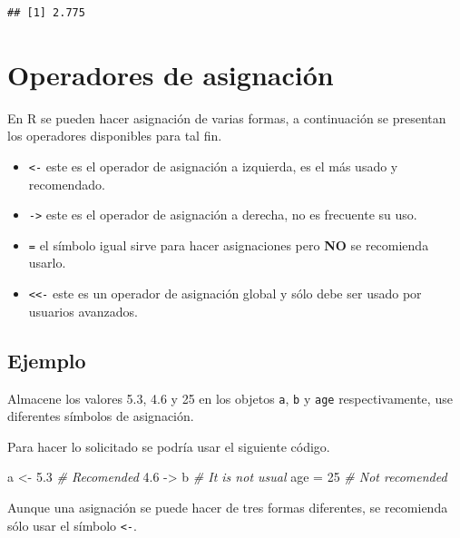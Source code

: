 \documentclass[
]{book}
\makeatletter
\newenvironment{Shaded}{\begin{snugshade}}{\end{snugshade}}
\newcommand{\CommentTok}[1]{\textcolor[rgb]{0.56,0.35,0.01}{\textit{#1}}}
\newcommand{\DecValTok}[1]{\textcolor[rgb]{0.00,0.00,0.81}{#1}}
\newcommand{\FloatTok}[1]{\textcolor[rgb]{0.00,0.00,0.81}{#1}}
\newcommand{\NormalTok}[1]{#1}
\newcommand{\OtherTok}[1]{\textcolor[rgb]{0.56,0.35,0.01}{#1}}
\providecommand{\tightlist}{%
  \setlength{\itemsep}{0pt}\setlength{\parskip}{0pt}}
\newenvironment{kframe}{%
\medskip{}
\setlength{\fboxsep}{.8em}
 \def\at@end@of@kframe{}%
 \ifinner\ifhmode%
  \def\at@end@of@kframe{\end{minipage}}%
  \begin{minipage}{\columnwidth}%
 \fi\fi%
 \def\FrameCommand##1{\hskip\@totalleftmargin \hskip-\fboxsep
 \colorbox{shadecolor}{##1}\hskip-\fboxsep
     \hskip-\linewidth \hskip-\@totalleftmargin \hskip\columnwidth}%
 \MakeFramed {\advance\hsize-\width
   \@totalleftmargin\z@ \linewidth\hsize
   \@setminipage}}%
 {\par\unskip\endMakeFramed%
 \at@end@of@kframe}
\renewenvironment{Shaded}{\begin{kframe}}{\end{kframe}}
\newenvironment{rmdblock}[1]
  {
  \begin{itemize}
  \renewcommand{\labelitemi}{
    \raisebox{-.7\height}[0pt][0pt]{
      {\setkeys{Gin}{width=3em,keepaspectratio}\texttt{[image: images/\#1]}}
    }
  }
  \setlength{\fboxsep}{1em}
  \begin{kframe}
  \item
  }
  {
  \end{kframe}
  \end{itemize}
  }
\newenvironment{rmdimportant}
  {\begin{rmdblock}{important}}
  {\end{rmdblock}}
\makeatother
\begin{document}
\begin{verbatim}
## [1] 2.775
\end{verbatim}

\hypertarget{operadores-de-asignaciuxf3n}{%
\section{Operadores de asignación}\label{operadores-de-asignaciuxf3n}}

En R se pueden hacer asignación de varias formas, a continuación se presentan los operadores disponibles para tal fin.

\begin{itemize}
\tightlist
\item
  \texttt{\textless{}-} este es el operador de asignación a izquierda, es el más usado y recomendado.
\item
  \texttt{-\textgreater{}} este es el operador de asignación a derecha, no es frecuente su uso.
\item
  \texttt{=} el símbolo igual sirve para hacer asignaciones pero \textbf{NO} se recomienda usarlo.
\item
  \texttt{\textless{}\textless{}-} este es un operador de asignación global y sólo debe ser usado por usuarios avanzados.
\end{itemize}

\hypertarget{ejemplo-5}{%
\subsection*{Ejemplo}\label{ejemplo-5}}

Almacene los valores 5.3, 4.6 y 25 en los objetos \texttt{a}, \texttt{b} y \texttt{age} respectivamente, use diferentes símbolos de asignación.

Para hacer lo solicitado se podría usar el siguiente código.

\begin{Shaded}
\begin{Highlighting}[]
\NormalTok{a }\OtherTok{\textless{}{-}} \FloatTok{5.3} \CommentTok{\# Recomended}
\FloatTok{4.6} \OtherTok{{-}\textgreater{}}\NormalTok{ b }\CommentTok{\# It is not usual}
\NormalTok{age }\OtherTok{=} \DecValTok{25} \CommentTok{\# Not recomended}
\end{Highlighting}
\end{Shaded}

\begin{rmdimportant}
Aunque una asignación se puede hacer de tres formas diferentes, se recomienda sólo usar el símbolo \texttt{\textless{}-}.
\end{rmdimportant}
\end{document}
